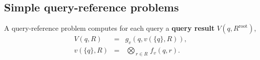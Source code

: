 \documentclass[twoside,leqno,twocolumn]{article}
\newcommand{\bigvec}[1]{\mathop{\overrightarrow{#1}}}
\newcommand{\summary}{\delta}
\newcommand{\defterm}[1]{{\bf #1}}
\newcommand{\kdroot}[1]{#1^{\text{root}}}
\newcommand{\lo}[1]{#1^{l}}
\newcommand{\up}[1]{#1^{u}}
\newcommand{\distlo}{\lo{d}}
\newcommand{\distup}{\up{d}}
\newcommand{\dist}[2]{d(#1,#2)}
\newcommand{\nameOp}[2]{\mathop{#1\nolimits\!\!_{#2}}}
\newcommand{\nameop}[2]{#1_{\!#2}}
\newcommand{\myOp}[1]{\nameOp{\bigotimes}{#1}}
\newcommand{\myop}[1]{\nameop{\otimes}{#1}}
\newcommand{\letterglob}{\psi}
\newcommand{\opglob}{\myop{\letterglob}}
\newcommand{\fglob}{f_{\letterglob}}
\newcommand{\canpruneglob}{C_{\letterglob}}
\newcommand{\deltaglob}{\summary_{\letterglob}}
\newcommand{\letterqr}{v}
\newcommand{\outqr}{V}
\newcommand{\Opqr}{\myOp{\letterqr}}
\newcommand{\fqr}{f_{\letterqr}}
\newcommand{\gqr}{g_{\letterqr}}
\newcommand{\inqrv}{v}
\newcommand{\letterstat}{s}
\newcommand{\outstat}{\sigma}
\newcommand{\opstat}{\myop{\letterstat}}
\newcommand{\fstat}{f_{\letterstat}}
\begin{document}
%


\subsection{Simple query-reference problems}
A query-reference problem computes for each query a \defterm{query result} $\outqr(q, \kdroot{R})$,
\begin{eqnarray}
\outqr(q, R) &=& \gqr(q, \inqrv(\{q\}, R)),
\\
\inqrv(\{q\}, R) &=& \Opqr_{r \in R} \fqr(q, r).
\label{eqn:qrdef}
\end{eqnarray}
\end{document}

